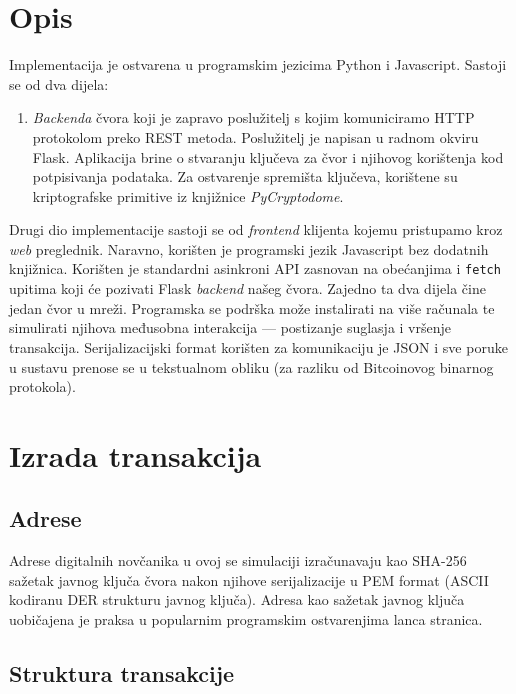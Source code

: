 \documentclass[utf8, zavrsni]{fer}
\begin{document}
\section{Opis}
Implementacija je ostvarena u programskim jezicima Python i Javascript. Sastoji se od dva dijela:
\begin{enumerate}
    \item \textit{Backenda} čvora koji je zapravo poslužitelj s kojim komuniciramo HTTP protokolom preko REST metoda. Poslužitelj je napisan u radnom okviru Flask. Aplikacija brine o stvaranju ključeva za čvor i njihovog korištenja kod potpisivanja podataka. Za ostvarenje spremišta ključeva, korištene su kriptografske primitive iz knjižnice \textit{PyCryptodome}.
\end{enumerate}
Drugi dio implementacije sastoji se od \textit{frontend} klijenta kojemu pristupamo kroz \textit{web} preglednik. Naravno, korišten je programski jezik Javascript bez dodatnih knjižnica. Korišten je standardni asinkroni API zasnovan na obećanjima i \texttt{fetch} upitima koji će pozivati Flask \textit{backend} našeg čvora. Zajedno ta dva dijela čine jedan čvor u mreži. Programska se podrška može instalirati na više računala te simulirati njihova međusobna interakcija --- postizanje suglasja i vršenje transakcija. Serijalizacijski format korišten za komunikaciju je JSON i sve poruke u sustavu prenose se u tekstualnom obliku (za razliku od Bitcoinovog binarnog protokola).

\section{Izrada transakcija}

\subsection{Adrese}
Adrese digitalnih novčanika u ovoj se simulaciji izračunavaju kao SHA-256 sažetak javnog ključa čvora nakon njihove serijalizacije u PEM format (ASCII kodiranu DER strukturu javnog ključa). Adresa kao sažetak javnog ključa uobičajena je praksa u popularnim programskim ostvarenjima lanca stranica.

\subsection{Struktura transakcije}
\end{document}
